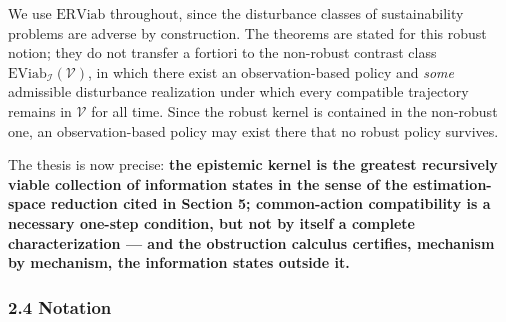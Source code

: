 \documentclass[11pt]{article}
\theoremstyle{definition}
\begin{document}
We use \(\mathrm{ERViab}\) throughout, since the disturbance classes of sustainability problems are adverse by construction. The theorems are stated for this robust notion; they do not transfer a fortiori to the non-robust contrast class \(\mathrm{EViab}_{\mathcal{I}}(\mathcal{V})\), in which there exist an observation-based policy and \emph{some} admissible disturbance realization under which every compatible trajectory remains in \(\mathcal{V}\) for all time. Since the robust kernel is contained in the non-robust one, an observation-based policy may exist there that no robust policy survives.

The thesis is now precise:
\textbf{the epistemic kernel is the greatest recursively viable collection of information states in the sense of the estimation-space reduction cited in Section 5; common-action compatibility is a necessary one-step condition, but not by itself a
complete characterization --- and the obstruction calculus certifies,
mechanism by mechanism, the information states outside it.}

\subsubsection{2.4 Notation}\label{notation}
\end{document}
